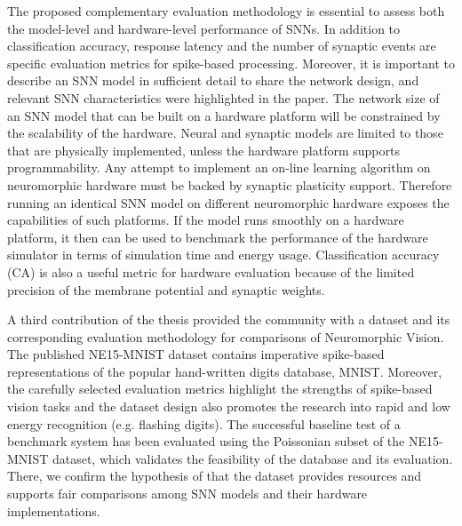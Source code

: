 The proposed complementary evaluation methodology is essential to assess both the model-level and hardware-level performance of SNNs.
In addition to classification accuracy, response latency and the number of synaptic events are specific evaluation metrics for spike-based processing.
Moreover, it is important to describe an SNN model in sufficient detail to share the network design, and relevant SNN characteristics were highlighted in the paper.  
The network size of an SNN model that can be built on a hardware platform will be constrained by the scalability of the hardware.
Neural and synaptic models are limited to those that are physically implemented, unless the hardware platform supports programmability.
Any attempt to implement an on-line learning algorithm on neuromorphic hardware must be backed by synaptic plasticity support.
Therefore running an identical SNN model on different neuromorphic hardware exposes the capabilities of such platforms.
If the model runs smoothly on a hardware platform, it then can be used to benchmark the performance of the hardware simulator in terms of simulation time and energy usage.
Classification accuracy (CA) is also a useful metric for hardware evaluation because of the limited precision of the membrane potential and synaptic weights.


A third contribution of the thesis provided the community with a dataset and its corresponding evaluation methodology for comparisons of Neuromorphic Vision.
The published NE15-MNIST dataset contains imperative spike-based representations of the popular hand-written digits database, MNIST.
Moreover, the carefully selected evaluation metrics highlight the strengths of spike-based vision tasks and the dataset design also promotes the research into rapid and low energy recognition (e.g. flashing digits).
The successful baseline test of a benchmark system has been evaluated using the Poissonian subset of the NE15-MNIST dataset, which validates the feasibility of the database and its evaluation.
There, we confirm the hypothesis of that the dataset provides resources and supports fair comparisons among SNN models and their hardware implementations.

%



